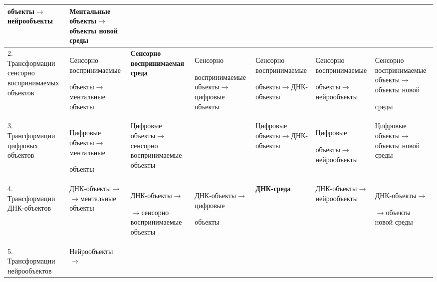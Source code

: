 \begin{table}
{\begin{sideways}
\begin{tabular}{|p{22mm}| p{24mm}| p{25mm}| p{25mm}| p{24mm}| p{25mm}| p{25mm}|}
объ\-ек\-ты\;$\to$\;ней\-ро\-объ\-ек\-ты&Мен\-таль\-ные объ\-ек\-ты\;$\to$\;объ\-ек\-ты новой среды\\

\hline

2. Транс\-фор\-ма\-ции сен\-сор\-но вос\-при\-ни\-ма\-емых объ\-ек\-тов&Сен\-сор\-но вос\-при\-ни\-ма\-емые 

объ\-ек\-ты\;$\to$\;мен\-таль\-ные объ\-ек\-ты&\textbf{Сен\-сор\-но вос\-при\-ни\-ма\-емая сре\-да}&Сен\-сор\-но 

воспринимаемые объ\-ек\-ты\;$\to$\;циф\-ро\-вые объ\-ек\-ты&Сен\-сор\-но вос\-при\-ни\-ма\-емые 

объ\-ек\-ты\;$\to$\;ДНК-объ\-ек\-ты&Сен\-сор\-но вос\-при\-ни\-ма\-емые 

объ\-ек\-ты\;$\to$\;ней\-ро\-объ\-ек\-ты&Сен\-сор\-но вос\-при\-ни\-ма\-емые объ\-ек\-ты\;$\to$\;объ\-ек\-ты но\-вой 

сре\-ды\\

\hline

3. Транс\-фор\-ма\-ции циф\-ро\-вых объектов&Цифровые объ\-ек\-ты\;$\to$\;мен\-таль\-ные 

объекты&Циф\-ро\-вые объ\-ек\-ты\;$\to$\;сен\-сор\-но вос\-при\-ни\-ма\-емые объ\-ек\-ты&\textbf{Циф\-ро\-вая 

сре\-да}&Циф\-ро\-вые объ\-ек\-ты\;$\to$\;ДНК-объ\-ек\-ты&Циф\-ро\-вые 

объ\-ек\-ты\;$\to$\;ней\-ро\-объ\-ек\-ты&Циф\-ро\-вые объ\-ек\-ты\;$\to$\;объ\-ек\-ты но\-вой сре\-ды\\

\hline

4. Транс\-фор\-ма\-ции ДНК-объ\-ек\-тов&ДНК-объ\-ек\-ты\;$\to$\newline$\to$\;мен\-таль\-ные объекты&ДНК-объ\-ек\-ты\;$\to$\newline

$\to$\;сен\-сор\-но воспринимаемые объекты&

ДНК-объ\-ек\-ты\;$\to$\;циф\-ро\-вые 

объекты&\textbf{ДНК-среда}&ДНК-объ\-ек\-ты\;$\to$\;ней\-ро\-объ\-ек\-ты&ДНК-объ\-ек\-ты\;$\to$\newline

$\to$\;объ\-ек\-ты новой среды\\

\hline

5. Трансформации ней\-ро\-объ\-ек\-тов&Ней\-ро\-объ\-ек\-ты\;$\to$\newline


\end{tabular}
\end{sideways}}
\end{table}
